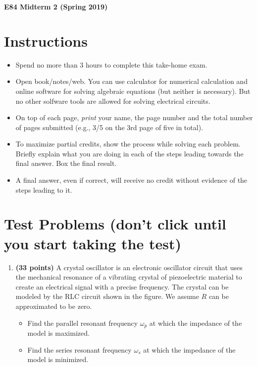 \usepackage{html}

\begin{center}
{\Large \bf E84 Midterm 2 (Spring 2019)}
\end{center}
\begin{enumerate}


\section*{Instructions}

\begin{itemize}
\item Spend no more than 3 hours to complete this take-home exam.
\item Open book/notes/web. You can use calculator for numerical
  calculation and online software for solving algebraic equations 
  (but neither is necessary). But no other solfware tools are allowed 
  for solving electrical circuits.
\item On top of each page, {\em print} your name, the page number
  and the total number of pages submitted (e.g., 3/5 on the 3rd page
  of five in total).
\item To maximize partial credits, show the process while solving
  each problem. Briefly explain what you are doing in each of the
  steps leading towards the final answer. Box the final result. 
\item A final answer, even if correct, will receive no credit
  without evidence of the steps leading to it.
\end{itemize}


\section*{Test Problems (don't click until you start taking the test)}

\begin{enumerate}

\item {\bf (33 points)} 
  A crystal oscillator is an electronic oscillator circuit that uses
  the mechanical resonance of a vibrating crystal of piezoelectric material
  to create an electrical signal with a precise frequency. The crystal can
  be modeled by the RLC circuit shown in the figure. We assume $R$ can be
  approximated to be zero.
  \begin{itemize}
    \item Find the parallel resonant frequency $\omega_p$ at which the 
      impedance of the model is maximized.    
    \item Find the series resonant frequency $\omega_s$ at which the 
      impedance of the model is minimized.
  \end{itemize}


\end{enumerate}
\end{enumerate}
